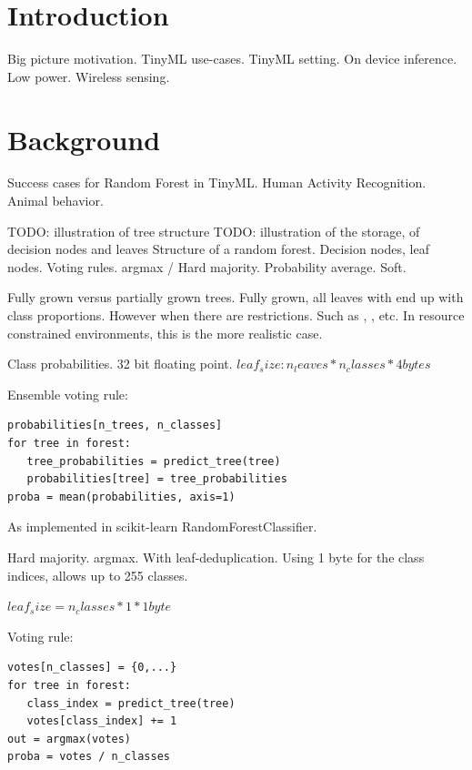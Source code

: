 \documentclass{article}
\begin{document}
\section{Introduction}

Big picture motivation.
TinyML use-cases.
TinyML setting. On device inference. Low power. Wireless sensing.

\noindent

\newpage
\section{Background}

\cite{random_forest_breiman2001}

Success cases for Random Forest in TinyML.
Human Activity Recognition. \cite{elsts_are_2021}
Animal behavior. \cite{tatler_high_2018} \cite{kleanthous_feature_2020} \cite{tran_iot-based_2022}


TODO: illustration of tree structure
TODO: illustration of the storage, of decision nodes and leaves
Structure of a random forest.
Decision nodes, leaf nodes.
Voting rules. argmax / Hard majority.
Probability average. Soft.

Fully grown versus partially grown trees.
Fully grown, all leaves with end up with class proportions.
However when there are restrictions. Such as , ,  etc.
In resource constrained environments, this is the more realistic case.


Class probabilities. 32 bit floating point.
$leaf_size: n_leaves * n_classes * 4 bytes$

Ensemble voting rule:
\begin{verbatim}
probabilities[n_trees, n_classes]
for tree in forest:
   tree_probabilities = predict_tree(tree)
   probabilities[tree] = tree_probabilities
proba = mean(probabilities, axis=1)
\end{verbatim}

As implemented in scikit-learn \cite{scikit-learn} RandomForestClassifier.

Hard majority. argmax. With leaf-deduplication.
Using 1 byte for the class indices, allows up to 255 classes.

$leaf_size = n_classes * 1 * 1 byte$

Voting rule:
\begin{verbatim}
votes[n_classes] = {0,...}
for tree in forest:
   class_index = predict_tree(tree)
   votes[class_index] += 1
out = argmax(votes)
proba = votes / n_classes
\end{verbatim}
\end{document}
